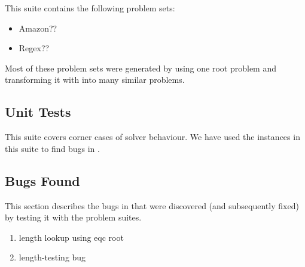         This suite contains the following problem sets:

        \begin{itemize}
            \item Amazon??
            \item Regex??
        \end{itemize}

        Most of these problem sets were generated by using one root problem and transforming it with \transformer{} into many similar problems.

    \subsection{Unit Tests}

        This suite covers corner cases of solver behaviour. We have used the instances in this suite to find bugs in \us{}.

    \subsection{Bugs Found}

        This section describes the bugs in \us{} that were discovered (and subsequently fixed) by testing it with the \fuzzer{} problem suites.

        \begin{enumerate}
            \item length lookup using eqc root
            \item length-testing bug
        \end{enumerate}
